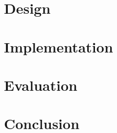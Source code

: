 \documentclass[12pt, a4paper]{book}
\begin{document}
\chapter{Design} 
\label{sec:design}

\chapter{Implementation}
\label{sec:implementation}

\chapter{Evaluation}
\label{sec:evaluation}

\chapter{Conclusion}
\label{sec:conclusion}

\backmatter    
{}

\end{document}
